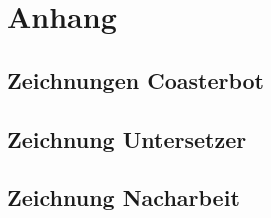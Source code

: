 \documentclass[
  a4paper,
  12pt,
  DIV=12,        %
  parskip=half,  %
  headings=small %
]{scrartcl}
\theoremstyle{definition}
\theoremstyle{definition}
\begin{document}
\newpage
\section{Anhang}
\subsection{Zeichnungen Coasterbot}


\subsection{Zeichnung Untersetzer}


\subsection{Zeichnung Nacharbeit}

\end{document}
